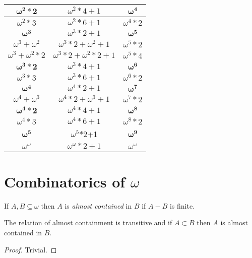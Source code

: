 \documentclass[oneside,12pt]{amsart}
\begin{document}
\begin{tabular}{|c|c|c|}
$\boldsymbol{\omega^2  *2}$ & $\omega^2*4+  1$ & $\boldsymbol{\omega^4}$ \\ \hline \hline
$\omega^2  *3$ & $\omega^2*6+  1$ & $\omega^4*2$ \\ \hline \hline
$\boldsymbol{\omega^3}$ & $\omega^3*2+  1$ & $\boldsymbol{\omega^5}$ \\ \hline \hline
$\omega^3 + \omega^2$ & $\omega^3 *2+ \omega^2 + 1$ & $\omega^5*2$ \\ \hline \hline
$\omega^3 + \omega^2*2$ & $\omega^3*2 + \omega^2*2 + 1$ & $\omega^5*4$ \\ \hline \hline
$\boldsymbol{\omega^3*2}$ & $\omega^3*4+1$ & $\boldsymbol{\omega^6}$ \\ \hline \hline
$\omega^3*3$ & $\omega^3*6+1$ & $\omega^6*2$ \\ \hline \hline
$\boldsymbol{\omega^4}$ & $\omega^4*2+1$ & $\boldsymbol{\omega^7}$ \\ \hline \hline
$\omega^4 + \omega^3$ & $\omega^4*2 + \omega^3 + 1$ & $\omega^7*2$ \\ \hline \hline
$\boldsymbol{\omega^4*2}$ & $\omega^4*4+1$ & $\boldsymbol{\omega^8}$ \\ \hline \hline
$\omega^4*3$ & $\omega^4*6+1$ & $\omega^8*2$ \\ \hline \hline
$\boldsymbol{\omega^5}$ &  $\omega^5$*2+1 & $\boldsymbol{\omega^9}$ \\ \hline \hline
$\omega^{\omega}$ & $\omega^{\omega}*2 + 1$ & $\omega^{\omega}$ \\ \hline \hline

\end{tabular}


\section{Combinatorics of $\omega$}
\begin{definition}
If $A,B \subseteq \omega$ then $A$ is  \emph{almost contained} in $B$ if
$A - B$ is finite.
\end{definition}

\begin{lemma}
The relation of almost containment is transitive and if $A\subset B$ then
$A$ is almost contained in $B$.
\end{lemma}
\begin{proof}
Trivial.
\end{proof}
\end{document}
